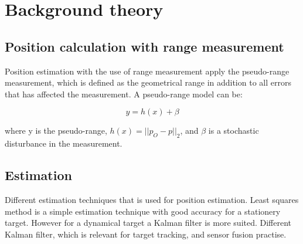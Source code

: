 \chapter{Background theory}
\section{Position calculation with range measurement}

Position estimation with the use of range measurement apply the pseudo-range measurement, which is defined as the geometrical range in addition to all errors that has affected the measurement. A pseudo-range model can be:

\begin{equation}
y = h(x) + \beta
\end{equation}

where y is the pseudo-range, $h(x) = ||p_O - p||_2$, and $\beta$ is a stochastic disturbance in the measurement.

\section{Estimation}
Different estimation techniques that is used for position estimation. Least squares method is a simple estimation technique with good accuracy for a stationery target. However for a dynamical target a Kalman filter is more suited. Different Kalman filter, which is relevant for target tracking, and sensor fusion practise.